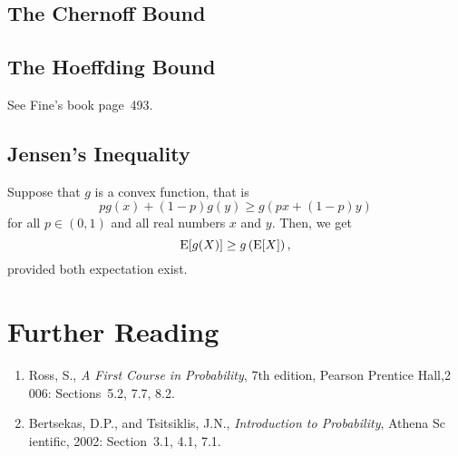 \subsection{The Chernoff Bound}

\subsection{The Hoeffding Bound}

See Fine's book page~493.

\subsection{Jensen's Inequality}

Suppose that $g$ is a convex function, that is
\begin{equation*}
p g(x) + (1-p) g(y) \geq g(px + (1-p)y)
\end{equation*}
for all $p \in (0,1)$ and all real numbers $x$ and $y$.
Then, we get
\begin{equation*}
\mathrm{E} [g(X)] \geq g \left( \mathrm{E} [X] \right) ,
\end{equation*}
provided both expectation exist.


\section*{Further Reading}

\begin{small}\begin{enumerate}\item Ross, S., \emph{A First Course in Probability}, 7th edition, Pearson Prentice Hall,2
006: Sections~5.2, 7.7, 8.2.
\item Bertsekas, D.P., and Tsitsiklis, J.N., \emph{Introduction to Probability}, Athena Sc
ientific, 2002: Section~3.1, 4.1, 7.1.
\end{enumerate}
\end{small}

